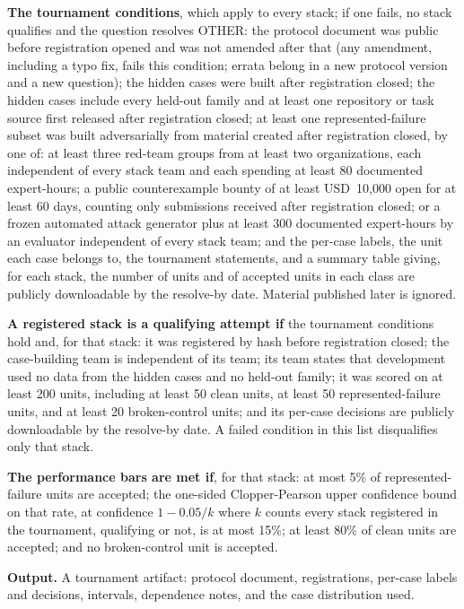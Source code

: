 \begin{predictionresolution}
\textbf{The tournament conditions}, which apply to every stack; if one fails, no stack qualifies and the question resolves OTHER:
the protocol document was public before registration opened and was not amended after that (any amendment, including a typo fix, fails this condition; errata belong in a new protocol version and a new question);
the hidden cases were built after registration closed;
the hidden cases include every held-out family and at least one repository or task source first released after registration closed;
at least one represented-failure subset was built adversarially from material created after registration closed, by one of: at least three red-team groups from at least two organizations, each independent of every stack team and each spending at least 80 documented expert-hours; a public counterexample bounty of at least USD~10{,}000 open for at least 60 days, counting only submissions received after registration closed; or a frozen automated attack generator plus at least 300 documented expert-hours by an evaluator independent of every stack team;
and the per-case labels, the unit each case belongs to, the tournament statements, and a summary table giving, for each stack, the number of units and of accepted units in each class are publicly downloadable by the resolve-by date.
Material published later is ignored.

\textbf{A registered stack is a qualifying attempt if} the tournament conditions hold and, for that stack:
it was registered by hash before registration closed;
the case-building team is independent of its team;
its team states that development used no data from the hidden cases and no held-out family;
it was scored on at least 200 units, including at least 50 clean units, at least 50 represented-failure units, and at least 20 broken-control units;
and its per-case decisions are publicly downloadable by the resolve-by date.
A failed condition in this list disqualifies only that stack.

\textbf{The performance bars are met if}, for that stack:
at most 5\% of represented-failure units are accepted;
the one-sided Clopper-Pearson upper confidence bound on that rate, at confidence $1-0.05/k$ where $k$ counts every stack registered in the tournament, qualifying or not, is at most 15\%;
at least 80\% of clean units are accepted;
and no broken-control unit is accepted.

\textbf{Output.} A tournament artifact: protocol document, registrations, per-case labels and decisions, intervals, dependence notes, and the case distribution used.
\end{predictionresolution}

